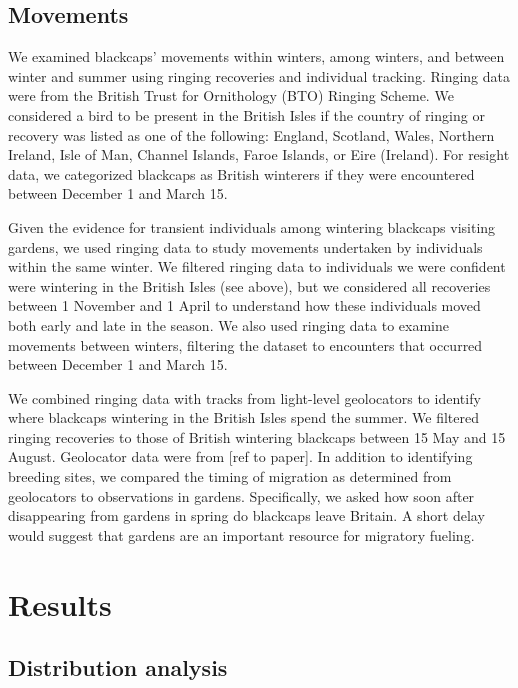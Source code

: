 \documentclass[a4paper, twoside]{templates/ociamthesis}
\begin{document}
\hypertarget{movements}{%
\subsection{Movements}\label{movements}}

We examined blackcaps' movements within winters, among winters, and between winter and summer using ringing recoveries and individual tracking. Ringing data were from the British Trust for Ornithology (BTO) Ringing Scheme. We considered a bird to be present in the British Isles if the country of ringing or recovery was listed as one of the following: England, Scotland, Wales, Northern Ireland, Isle of Man, Channel Islands, Faroe Islands, or Eire (Ireland). For resight data, we categorized blackcaps as British winterers if they were encountered between December 1 and March 15.

Given the evidence for transient individuals among wintering blackcaps visiting gardens, we used ringing data to study movements undertaken by individuals within the same winter. We filtered ringing data to individuals we were confident were wintering in the British Isles (see above), but we considered all recoveries between 1 November and 1 April to understand how these individuals moved both early and late in the season. We also used ringing data to examine movements between winters, filtering the dataset to encounters that occurred between December 1 and March 15.

We combined ringing data with tracks from light-level geolocators to identify where blackcaps wintering in the British Isles spend the summer. We filtered ringing recoveries to those of British wintering blackcaps between 15 May and 15 August. Geolocator data were from {[}ref to paper{]}. In addition to identifying breeding sites, we compared the timing of migration as determined from geolocators to observations in gardens. Specifically, we asked how soon after disappearing from gardens in spring do blackcaps leave Britain. A short delay would suggest that gardens are an important resource for migratory fueling.

\hypertarget{results}{%
\section{Results}\label{results}}

\hypertarget{distribution-analysis}{%
\subsection{Distribution analysis}\label{distribution-analysis}}
\end{document}
